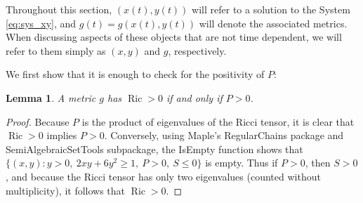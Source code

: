 \documentclass{amsart}
\numberwithin{equation}{section}
\newtheorem{lemma}[equation]{Lemma}
\theoremstyle{plain}
\theoremstyle{definition}
\theoremstyle{remark}
\numberwithin{table}{section}
\DeclareMathOperator{\Ric}{Ric}
\begin{document}
    
    
    Throughout this section, $(x(t),y(t))$ will refer to a solution to the System \eqref{eq:sys_xy}, and $g(t) = g(x(t),y(t))$ will denote the associated metrics.
    When discussing aspects of these objects that are not time dependent, we will refer to them simply as $(x,y)$ and $g$, respectively.
    
    
    We first show that it is enough to check for the positivity of $P$:

    
    \begin{lemma}\label{lem:ISTS_P>0}
        A metric $g$ has $\Ric > 0$ if and only if $P > 0$.
    \end{lemma}

    \begin{proof}


        Because $P$ is the product of eigenvalues of the  Ricci tensor, it is clear that $\Ric> 0$ implies $P>0$. 
        Conversely, using Maple's RegularChains package and SemiAlgebraicSetTools subpackage, the IsEmpty function shows that $\{(x,y) : y>0, \ 2 x y + 6 y^2 \geq 1, \ P > 0, \ S \leq 0\}$ is empty.
        Thus if $P>0$, then $S>0$, and because the Ricci tensor has only two eigenvalues (counted without multiplicity), it follows that $\Ric>0$.
    \end{proof}
\end{document}
